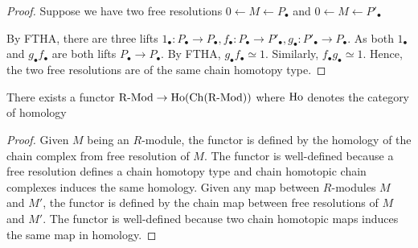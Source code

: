 \documentclass{report}
\begin{document}
\begin{proof}
    Suppose we have two free resolutions $0 \leftarrow M \leftarrow P_\bullet$ and $0 \leftarrow M \leftarrow P'_\bullet$

    \begin{center}
    \end{center}
    
    By FTHA, there are three lifts $1_\bullet: P_\bullet \to P_\bullet, f_\bullet: P_\bullet \to P'_\bullet, g_\bullet: P'_\bullet \to P_\bullet$. As both $1_\bullet$ and $g_\bullet f_\bullet$ are both lifts $P_\bullet \to P_\bullet$. By FTHA, $g_\bullet f_\bullet \simeq 1$. Similarly, $f_\bullet g_\bullet \simeq 1$. Hence, the two free resolutions are of the same chain homotopy type.

    
\end{proof}

\begin{corollary}
    There exists a functor $\operatorname{R-Mod} \to \operatorname{Ho}(\operatorname{Ch}(\operatorname{R-Mod}))$ where $\operatorname{Ho}$ denotes the category of homology 
\end{corollary}

\begin{proof}
    Given $M$ being an $R$-module, the functor is defined by the homology of the chain complex from free resolution of $M$. The functor is well-defined because a free resolution defines a chain homotopy type and chain homotopic chain complexes induces the same homology. Given any map between $R$-modules $M$ and $M'$, the functor is defined by the chain map between free resolutions of $M$ and $M'$. The functor is well-defined because two chain homotopic maps induces the same map in homology.
\end{proof}
\end{document}
